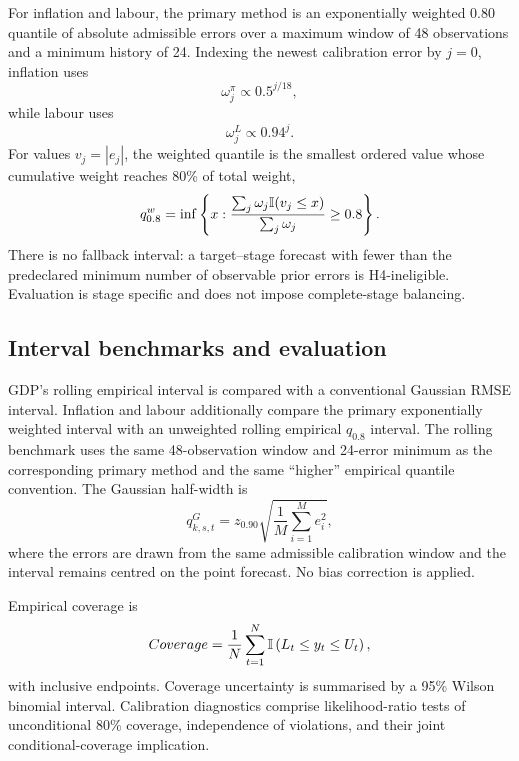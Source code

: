 For inflation and labour, the primary method is an exponentially weighted
0.80 quantile of absolute admissible errors over a maximum window of 48
observations and a minimum history of 24.  Indexing the newest calibration
error by \(j=0\), inflation uses
\begin{equation}
    \omega_j^{\pi}
    \propto
    0.5^{j/18},
    \label{eq:h4_inflation_weights}
\end{equation}
while labour uses
\begin{equation}
    \omega_j^{L}
    \propto
    0.94^j.
    \label{eq:h4_labour_weights}
\end{equation}
For values \(v_j=|e_j|\), the weighted quantile is the smallest ordered value
whose cumulative weight reaches 80\% of total weight,
\begin{equation}
    q_{0.8}^{w}
    =
    \inf\left\{
        x:
        \frac{\sum_j \omega_j\mathbb{I}(v_j\leq x)}
             {\sum_j \omega_j}
        \geq 0.8
    \right\}.
    \label{eq:h4_weighted_quantile}
\end{equation}
There is no fallback interval: a target--stage forecast with fewer than the
predeclared minimum number of observable prior errors is H4-ineligible.
Evaluation is stage specific and does not impose complete-stage balancing.

\subsection{Interval benchmarks and evaluation}
\label{subsec:interval_metrics}

GDP's rolling empirical interval is compared with a conventional Gaussian
RMSE interval.  Inflation and labour additionally compare the primary
exponentially weighted interval with an unweighted rolling empirical
\(q_{0.8}\) interval.  The rolling benchmark uses the same 48-observation
window and 24-error minimum as the corresponding primary method and the same
``higher'' empirical quantile convention.  The Gaussian half-width is
\begin{equation}
    q_{k,s,t}^{G}
    =
    z_{0.90}
    \sqrt{
        \frac{1}{M}\sum_{i=1}^{M} e_i^2
    },
    \label{eq:h4_gaussian}
\end{equation}
where the errors are drawn from the same admissible calibration window and
the interval remains centred on the point forecast.  No bias correction is
applied.

Empirical coverage is
\begin{equation}
    Coverage
    =
    \frac{1}{N}\sum_{t=1}^{N}
    \mathbb{I}\left(L_t\leq y_t\leq U_t\right),
    \label{eq:coverage}
\end{equation}
with inclusive endpoints.  Coverage uncertainty is summarised by a 95\%
Wilson binomial interval.  Calibration diagnostics comprise likelihood-ratio
tests of unconditional 80\% coverage, independence of violations, and their
joint conditional-coverage implication.


